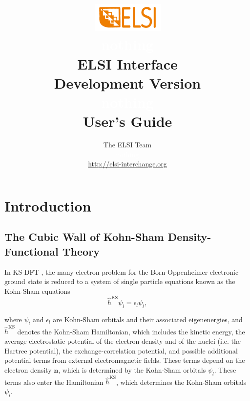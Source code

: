 \documentclass{report}
\begin{document}
\title{\includegraphics[scale=0.07]{elsi_logo.png}\\ \textcolor{white}{nothing}\\ \textbf{ELSI Interface\\ Development Version\\ \textcolor{white}{nothing} \\ User's Guide}}
\author{The ELSI Team\\ \textcolor{white}{nothing}\\ \url{http://elsi-interchange.org}}
\maketitle

\tableofcontents

\chapter{Introduction}
\section{The Cubic Wall of Kohn-Sham Density-Functional Theory}
\label{sec:ksdft}
In KS-DFT \cite{ks_kohn_1965}, the many-electron problem for the Born-Oppenheimer electronic ground state is reduced to a system of single particle equations known as the Kohn-Sham equations\\
\begin{equation}
\label{eq:ks}
\hat{h}^\text{KS} \psi_l = \epsilon_l \psi_l ,
\end{equation}

\noindent where $\psi_l$ and $\epsilon_l$ are Kohn-Sham orbitals and their associated eigenenergies, and $\hat{h}^\text{KS}$ denotes the Kohn-Sham Hamiltonian, which includes the kinetic energy, the average electrostatic potential of the electron density and of the nuclei (i.e. the Hartree potential), the exchange-correlation potential, and possible additional potential terms from external electromagnetic fields.  These terms depend on the electron density $\boldsymbol{n}$, which is determined by the Kohn-Sham orbitals $\psi_l$.  These terms also enter the Hamiltonian $\hat{h}^\text{KS}$, which determines the Kohn-Sham orbitals $\psi_l$.\\
\end{document}
